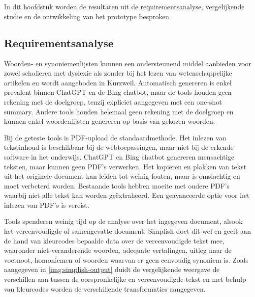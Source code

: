 
\chapter{}%
\label{ch:discussie}

In dit hoofdstuk worden de resultaten uit de requirementsanalyse, vergelijkende studie en de ontwikkeling van het prototype besproken. 

\section{Requirementsanalyse}

Woorden- en synoniemenlijsten kunnen een ondersteunend middel aanbieden voor zowel scholieren met dyslexie als zonder bij het lezen van wetenschappelijke artikelen en wordt aangeboden in Kurzweil. Automatisch genereren is enkel prevalent binnen ChatGPT en de Bing chatbot, maar de tools houden geen rekening met de doelgroep, tenzij expliciet aangegeven met een one-shot summary. Andere tools houden helemaal geen rekening met de doelgroep en kunnen enkel woordenlijsten genereren op basis van gekozen woorden. 

\medspace


Bij de geteste tools is PDF-upload de standaardmethode. Het inlezen van tekstinhoud is beschikbaar bij de webtoepassingen, maar niet bij de erkende software in het onderwijs. ChatGPT en Bing chatbot genereren mensachtige teksten, maar kunnen geen PDF's verwerken. Het kopiëren en plakken van tekst uit het originele document kan leiden tot weinig fouten, maar is omslachtig en moet verbeterd worden. Bestaande tools hebben moeite met oudere PDF's waarbij niet alle tekst kan worden geëxtraheerd. Een geavanceerde optie voor het inlezen van PDF's is vereist.

\medspace

Tools spenderen weinig tijd op de analyse over het ingegeven document, alsook het vereenvoudigde of samengevatte document. Simplish doet dit wel en geeft aan de hand van kleurcodes bepaalde data over de vereenvoudigde tekst mee, waaronder niet-veranderende woorden, adequate vertalingen, uitleg naar de voetnoot, homoniemen of woorden waarvan er geen eenvoudig synoniem is. Zoals aangegeven in \ref{img:simplish-output} duidt de vergelijkende weergave de verschillen aan tussen de oorspronkelijke en vereenvoudigde tekst en met behulp van kleurcodes worden de verschillende transformaties aangegeven.

